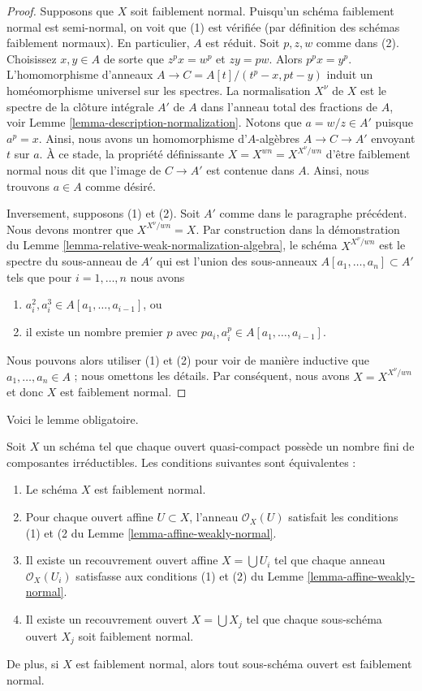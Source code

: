 \begin{proof}
Supposons que $X$ soit faiblement normal. Puisqu'un schéma faiblement normal
est semi-normal, on voit que (1) est vérifiée (par définition des schémas
faiblement normaux). En particulier, $A$ est réduit.
Soit $p, z, w$ comme dans (2). Choisissez $x, y \in A$ de sorte
que $z^p x = w^p$ et $zy = pw$. Alors
$p^p x = y^p$. L’homomorphisme d’anneaux $A \to C = A[t]/(t^p - x, pt - y)$ induit un homéomorphisme universel
sur les spectres. La normalisation $X^\nu$
de $X$ est le spectre de la clôture
intégrale $A'$ de $A$ dans l’anneau total
des fractions de $A$, voir Lemme \ref{lemma-description-normalization}.
Notons que $a = w/z \in A'$ puisque $a^p = x$.
Ainsi, nous avons un homomorphisme d'$A$-algèbres $A \to C \to A'$
envoyant $t$ sur $a$.
À ce stade, la propriété définissante $X = X^{wn} = X^{X^\nu/wn}$ d'être faiblement
normal nous dit que l'image de $C \to A'$ est contenue dans $A$. Ainsi,
nous trouvons $a \in A$ comme désiré.

\medskip\noindent
Inversement, supposons (1) et (2). Soit $A'$ comme dans le
paragraphe précédent. Nous devons montrer que $X^{X^\nu/wn} = X$. Par
construction dans la démonstration du Lemme \ref{lemma-relative-weak-normalization-algebra}, le
schéma $X^{X^\nu/wn}$ est le spectre du sous-anneau
de $A'$ qui est l'union des sous-anneaux $A[a_1, \ldots, a_n] \subset A'$ tels
que pour $i = 1, \ldots, n$ nous avons
\begin{enumerate}
\item[(a)] $a_i^2, a_i^3 \in A[a_1, \ldots, a_{i - 1}]$, ou
\item[(b)] il existe un nombre premier
$p$ avec $pa_i, a_i^p \in A[a_1, \ldots, a_{i - 1}]$.
\end{enumerate}
Nous pouvons alors utiliser (1) et (2) pour voir de manière inductive que $a_1, \ldots, a_n \in A$ ; nous
omettons les détails. Par conséquent, nous avons $X = X^{X^\nu/wn}$ et donc $X$
est faiblement normal.
\end{proof}

\noindent
Voici le lemme obligatoire.

\begin{lemma}
\label{lemma-locally-weakly-normal}
Soit $X$ un schéma tel que chaque ouvert quasi-compact possède un nombre
fini de composantes irréductibles. Les conditions suivantes sont équivalentes :
\begin{enumerate}
\item Le schéma $X$ est faiblement normal.
\item Pour chaque ouvert affine $U \subset X$, l'anneau $\mathcal{O}_X(U)$
satisfait les conditions (1) et (2 du Lemme \ref{lemma-affine-weakly-normal}.
\item Il existe un recouvrement ouvert affine $X = \bigcup U_i$ tel
que chaque anneau $\mathcal{O}_X(U_i)$
satisfasse aux conditions (1) et (2) du Lemme \ref{lemma-affine-weakly-normal}.
\item Il existe un recouvrement ouvert $X = \bigcup X_j$ tel que chaque
sous-schéma ouvert $X_j$ soit faiblement normal.
\end{enumerate}
De plus, si $X$ est faiblement normal, alors tout sous-schéma ouvert est faiblement normal.
\end{lemma}

